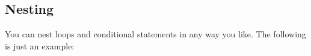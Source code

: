 \documentclass[11pt]{cselabheader}
\begin{document}
{%
%
%
%
%
%
%
%
%
%
%
%
%
%
%
%

\subsection{Nesting}

You can nest loops and conditional statements in any way you
like. The following is just an example:

}
\end{document}
